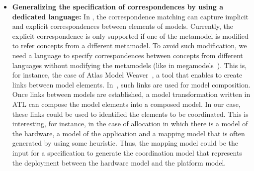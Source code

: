 \begin{itemize}
	\item \textbf{Generalizing the specification of correspondences by using a dedicated language:} In \bcool, the correspondence matching can capture implicit and explicit correspondences between elements of models. Currently, the explicit correspondence is only supported if one of the metamodel is modified to refer concepts from a different metamodel. To avoid such modification, we need a language to specify correspondences between concepts from different languages without modifying the metamodels (\eg like in megamodels~\cite{bezivinmegamodels}). This is, for instance, the case of Atlas Model Weaver~\cite{amwbib}, a tool that enables to create links between model elements. In~\cite{amwcompobib}, such links are used for model composition. Once links between models are established, a model transformation written in ATL can compose the model elements into a composed model. In our case, these links could be used to identified the elements to be coordinated. This is interesting, for instance, in the case of allocation in which there is a model of the hardware, a model of the application and a mapping model that is often generated by using some heuristic. Thus, the mapping model could be the input for a \bcool specification to generate the coordination model that represents the deployment between the hardware model and the platform model.
	

\end{itemize}
